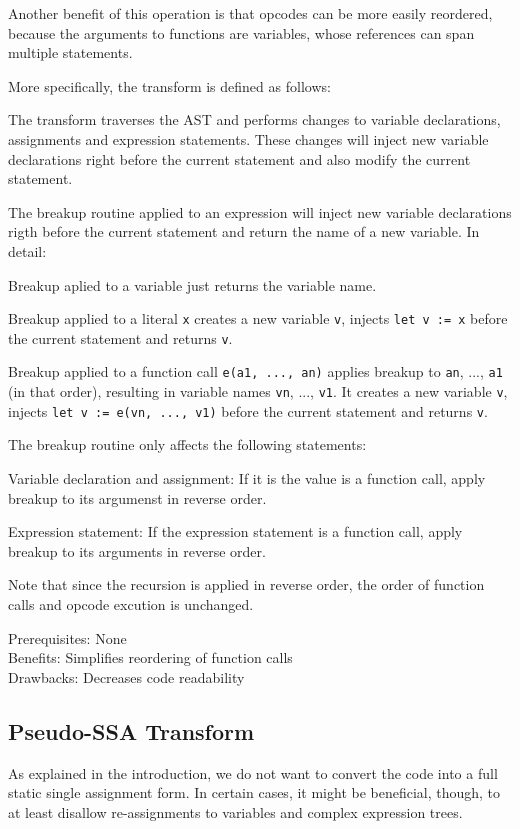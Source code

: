 \documentclass[11pt,letterpaper]{article}
\begin{document}
Another benefit of this operation is that opcodes can be more easily reordered,
because the arguments to functions are variables, whose references can span
multiple statements.

More specifically, the transform is defined as follows:

The transform traverses the AST and performs changes to
variable declarations, assignments and expression statements.
These changes will inject new variable declarations right before
the current statement and also modify the current statement.

The breakup routine applied to an expression will inject
new variable declarations rigth before the current statement
and return the name of a new variable. In detail:

Breakup aplied to a variable just returns the variable name.

Breakup applied to a literal \verb|x| creates a new variable
\verb|v|, injects \verb|let v := x| before the current statement
and returns \verb|v|.

Breakup applied to a function call \verb|e(a1, ..., an)|
applies breakup to \verb|an|, ..., \verb|a1| (in that order),
resulting in variable names \verb|vn|, ..., \verb|v1|.
It creates a new variable \verb|v|, injects \verb|let v := e(vn, ..., v1)|
before the current statement and returns \verb|v|.

The breakup routine only affects the following statements:

Variable declaration and assignment: If it is the value is a function call,
apply breakup to its argumenst in reverse order.

Expression statement: If the expression statement is a function call,
apply breakup to its arguments in reverse order.

Note that since the recursion is applied in reverse order, the
order of function calls and opcode excution is unchanged.


Prerequisites: None\\
Benefits: Simplifies reordering of function calls\\
Drawbacks: Decreases code readability

\subsection{Pseudo-SSA Transform}

As explained in the introduction, we do not want to convert the code into a full
static single assignment form. In certain cases, it might be beneficial, though,
to at least disallow re-assignments to variables and complex expression trees.
\end{document}
